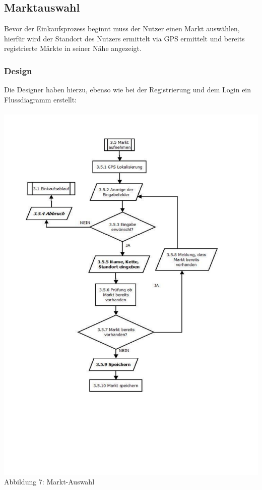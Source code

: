 \documentclass[12pt,a4paper]{article}
\begin{document}
\subsection{Marktauswahl}
Bevor der Einkaufsprozess beginnt muss der Nutzer einen Markt auswählen, hierfür wird der Standort des Nutzers ermittelt via GPS ermittelt und bereits registrierte Märkte in seiner Nähe angezeigt. 
\subsubsection*{Design}
Die Designer haben hierzu, ebenso wie bei der Registrierung und dem Login ein Flussdiagramm erstellt: 
\\
\\
\hspace*{-10mm} 
\includegraphics[trim = 17mm 40mm 0mm 20mm, clip, scale=0.8]{Markt-Aufnahme.pdf}
\\
\footnotesize Abbildung 7: Markt-Auswahl
\normalsize
\end{document}
